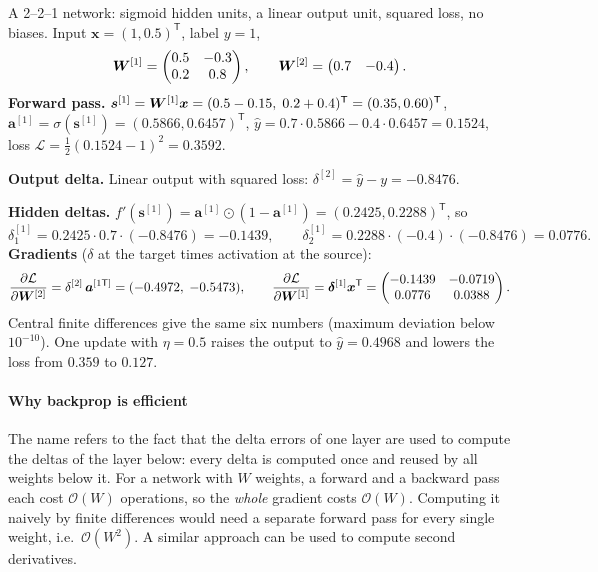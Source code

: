 \documentclass[11pt, oneside]{book}
\newcommand{\pd}[2]{\frac{\partial #1}{\partial #2}}
\newcommand{\T}{^{\mathsf{T}}}           %
\newcommand{\loss}{\mathcal{L}}          %
\newcommand{\params}{\boldsymbol{\theta}}   %
\newcommand{\bigO}[1]{\mathcal{O}\!\left(#1\right)}
\newcommand{\bx}{\bm{x}}        \newcommand{\by}{\bm{y}}
\newcommand{\ba}{\bm{a}}        \newcommand{\bs}{\bm{s}}
\newcommand{\bdelta}{\bm{\delta}}
\newcommand{\lay}[1]{^{[#1]}}            %
\begin{document}
\begin{exbox}[title={Backpropagation with numbers (checked by finite differences)}]
A 2--2--1 network: sigmoid hidden units, a linear output unit, squared loss,
no biases. Input $\bx = (1, 0.5)\T$, label $y = 1$,
\[
  \bW\lay{1} = \begin{pmatrix} 0.5 & -0.3 \\ 0.2 & 0.8 \end{pmatrix}, \qquad
  \bW\lay{2} = \begin{pmatrix} 0.7 & -0.4 \end{pmatrix}.
\]
\textbf{Forward pass.}
$\bs\lay{1} = \bW\lay{1}\bx = (0.5 - 0.15,\; 0.2 + 0.4)\T = (0.35, 0.60)\T$,
$\ba\lay{1} = \sigma(\bs\lay{1}) = (0.5866, 0.6457)\T$,
$\hat y = 0.7 \cdot 0.5866 - 0.4 \cdot 0.6457 = 0.1524$,
loss $\loss = \frac12(0.1524 - 1)^2 = 0.3592$.

\textbf{Output delta.} Linear output with squared loss:
$\delta\lay{2} = \hat y - y = -0.8476$.

\textbf{Hidden deltas.} $f'(\bs\lay{1}) = \ba\lay{1}\odot(1 - \ba\lay{1})
= (0.2425, 0.2288)\T$, so
\[
  \delta\lay{1}_1 = 0.2425 \cdot 0.7 \cdot (-0.8476) = -0.1439, \qquad
  \delta\lay{1}_2 = 0.2288 \cdot (-0.4) \cdot (-0.8476) = 0.0776 .
\]
\textbf{Gradients} ($\delta$ at the target times activation at the source):
\[
  \pd{\loss}{\bW\lay{2}} = \delta\lay{2}\,\ba\lay{1\mathsf{T}} = (-0.4972,\; -0.5473),
  \qquad
  \pd{\loss}{\bW\lay{1}} = \bdelta\lay{1}\bx\T =
  \begin{pmatrix} -0.1439 & -0.0719 \\ 0.0776 & 0.0388 \end{pmatrix}.
\]
Central finite differences give the same six numbers (maximum deviation
below $10^{-10}$). One update with $\eta = 0.5$ raises the output to
$\hat y = 0.4968$ and lowers the loss from $0.359$ to $0.127$.
\end{exbox}

\paragraph{Why backprop is efficient}
The name refers to the fact that the delta errors of one layer are used to
compute the deltas of the layer below: every delta is computed once and
reused by all weights below it. For a network with $W$ weights, a forward
and a backward pass each cost $\bigO{W}$ operations, so the \emph{whole}
gradient costs $\bigO{W}$. Computing it naively by finite differences would
need a separate forward pass for every single weight, i.e.\ $\bigO{W^2}$. A
similar approach can be used to compute second derivatives.
\end{document}
